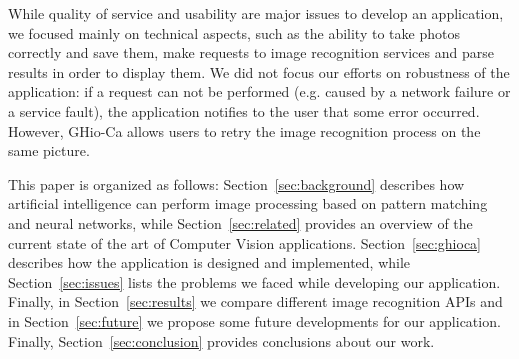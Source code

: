 While quality of service and usability are major issues to develop an 
application, we focused mainly on technical aspects, such as the ability to 
take photos correctly and save them, make requests to image recognition services 
and parse results in order to display them. We did not focus our efforts on 
robustness of the application: if a request can not be performed (e.g. 
caused by a network failure or a service fault), the application notifies to the 
user that some error occurred. However, GHio-Ca allows users to retry the image 
recognition process on the same picture.

This paper is organized as follows: Section~\ref{sec:background} describes how 
artificial intelligence can perform image processing based on pattern matching 
and neural networks, while Section~\ref{sec:related} provides an overview of the 
current state of the art of Computer Vision applications. Section~\ref{sec:ghioca} 
describes how the application is designed and implemented, while
Section~\ref{sec:issues} lists the problems we faced while developing our 
application. Finally, in Section~\ref{sec:results} we compare different image 
recognition APIs and in Section~\ref{sec:future} we propose some future 
developments for our application. Finally, Section~\ref{sec:conclusion} provides 
conclusions about our work.